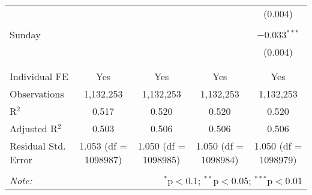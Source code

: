 \documentclass[
]{article}
\begin{document}
\begin{table}[!htbp]
{\begin{tabular}{@{\extracolsep{5pt}}lcccc}
  &  &  &  & (0.004) \\ 
  & & & & \\ 
 Sunday &  &  &  & $-$0.033$^{***}$ \\ 
  &  &  &  & (0.004) \\ 
  & & & & \\ 
\hline \\[-1.8ex] 
Individual FE & Yes & Yes & Yes & Yes \\ 
Observations & 1,132,253 & 1,132,253 & 1,132,253 & 1,132,253 \\ 
R$^{2}$ & 0.517 & 0.520 & 0.520 & 0.520 \\ 
Adjusted R$^{2}$ & 0.503 & 0.506 & 0.506 & 0.506 \\ 
Residual Std. Error & 1.053 (df = 1098987) & 1.050 (df = 1098985) & 1.050 (df = 1098984) & 1.050 (df = 1098979) \\ 
\hline 
\hline \\[-1.8ex] 
\textit{Note:}  & \multicolumn{4}{r}{$^{*}$p$<$0.1; $^{**}$p$<$0.05; $^{***}$p$<$0.01} \\ 
\end{tabular}
} 
\end{table} 
\newpage
\end{document}
